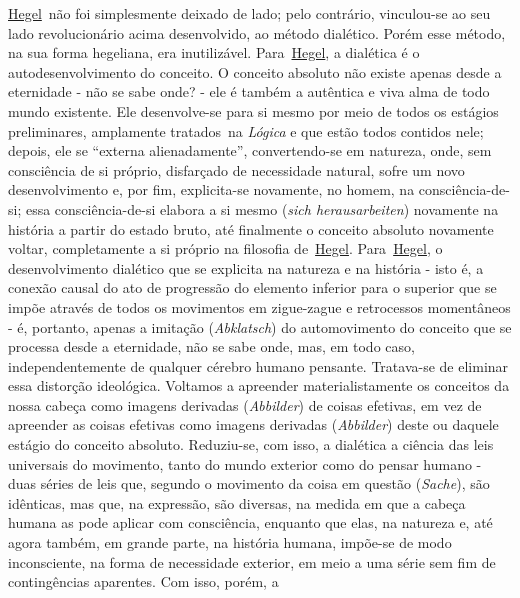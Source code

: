 \href{https://www.marxists.org/portugues/dicionario/verbetes/h/hegel.htm}{Hegel}~não
foi simplesmente deixado de lado; pelo contrário, vinculou-se ao seu
lado revolucionário acima desenvolvido, ao método dialético. Porém esse
método, na sua forma hegeliana, era inutilizável.
Para~\href{https://www.marxists.org/portugues/dicionario/verbetes/h/hegel.htm}{Hegel},
a dialética é o autodesenvolvimento do conceito. O conceito absoluto não
existe apenas desde a eternidade - não se sabe onde? - ele é também a
autêntica e viva alma de todo mundo existente. Ele desenvolve-se para si
mesmo por meio de todos os estágios preliminares, amplamente tratados~na
\emph{Lógica} e que estão todos contidos nele; depois, ele se ``externa
alienadamente'', convertendo-se em natureza, onde, sem consciência de si
próprio, disfarçado de necessidade natural, sofre um novo
desenvolvimento e, por fim, explicita-se novamente, no homem, na
consciência-de-si; essa consciência-de-si elabora a si mesmo (\emph{sich
herausarbeiten}) novamente na história a partir do estado bruto, até
finalmente o conceito absoluto novamente voltar, completamente a si
próprio na filosofia
de~\href{https://www.marxists.org/portugues/dicionario/verbetes/h/hegel.htm}{Hegel}.
Para~\href{https://www.marxists.org/portugues/dicionario/verbetes/h/hegel.htm}{Hegel},
o desenvolvimento dialético que se explicita na natureza e na história -
isto é, a conexão causal do ato de progressão do elemento inferior para
o superior que se impõe através de todos os movimentos em zigue-zague e
retrocessos momentâneos - é, portanto, apenas a imitação
(\emph{Abklatsch}) do automovimento do conceito que se processa desde a
eternidade, não se sabe onde, mas, em todo caso, independentemente de
qualquer cérebro humano pensante. Tratava-se de eliminar essa distorção
ideológica. Voltamos a apreender materialistamente os conceitos da nossa
cabeça como imagens derivadas (\emph{Abbilder}) de coisas efetivas, em
vez de apreender as coisas efetivas como imagens derivadas
(\emph{Abbilder}) deste ou daquele estágio do conceito absoluto.
Reduziu-se, com isso, a dialética a ciência das leis universais do
movimento, tanto do mundo exterior como do pensar humano - duas séries
de leis que, segundo o movimento da coisa em questão (\emph{Sache}), são
idênticas, mas que, na expressão, são diversas, na medida em que a
cabeça humana as pode aplicar com consciência, enquanto que elas, na
natureza e, até agora também, em grande parte, na história humana,
impõe-se de modo inconsciente, na forma de necessidade exterior, em meio
a uma série sem fim de contingências aparentes. Com isso, porém, a
